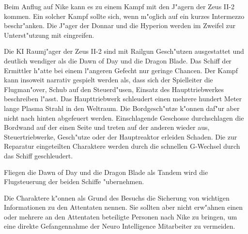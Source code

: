 \begin{remarks}
	Beim Anflug auf Nike kann es zu einem Kampf mit den J"agern der Zeus II-2 kommen. Ein solcher Kampf sollte sich, wenn m"oglich auf ein kurzes Intermezzo beschr"anken. Die J"ager der Donnar und die Hyperion werden im Zweifel zur Unterst"utzung mit eingreifen. 
	
	Die KI Raumj"ager der Zeus II-2 sind mit Railgun Gesch"utzen ausgestattet und deutlich wendiger als die Dawn of Day und die Dragon Blade. Das Schiff der Ermittler h"atte bei einem l"angeren Gefecht nur geringe Chancen. Der Kampf kann insoweit narrativ gespielt werden als, dass sich der Spielleiter die Flugman"over, Schub auf den Steuerd"usen, Einsatz des Haupttriebwerkes beschreiben l"asst. Das Haupttriebwerk schleudert einen mehrere hundert Meter lange Plasma Strahl in den Weltraum. Die Bordgesch"utze k"onnen daf"ur aber nicht nach hinten abgefeuert werden. Einschlagende Geschosse durchschlagen die Bordwand auf der einen Seite und treten auf der anderen wieder aus, Steuertriebwerke, Gesch"utze oder der Hauptreaktor erleiden Schaden. Die zur Reparatur eingeteilten Charaktere werden durch die schnellen G-Wechsel durch das Schiff geschleudert.

	Fliegen die Dawn of Day und die Dragon Blade als Tandem wird \xl{} die Flugsteuerung der beiden Schiffe "ubernehmen.

	Die Charaktere k"onnen als Grund des Besuchs die Sicherung von wichtigen Informationen zu den Attentaten nennen. Sie sollten aber nicht erw"ahnen einen oder mehrere an den Attentaten beteiligte Personen nach Nike zu bringen, um eine direkte Gefangennahme der Neuro Intelligence Mitarbeiter zu vermeiden.
\end{remarks}
\newpage
